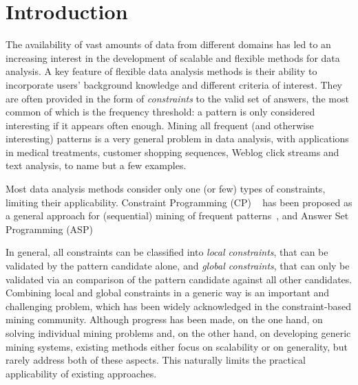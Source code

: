 

\section{Introduction}\label{sec:intro}
The availability of vast amounts of data from different domains has led to an increasing interest in the development of scalable and flexible methods for data analysis.
A key feature of flexible data analysis methods is their ability to incorporate users' background knowledge and different criteria of interest. They are often provided in the form of \emph{constraints} to the valid set of answers, the most common of which is the frequency threshold: a pattern is only considered interesting if it appears often enough. Mining all frequent (and otherwise interesting) patterns is a very general problem in data analysis, with applications in medical treatments, customer shopping sequences, Weblog click streams and text analysis, to name but a few examples.

Most data analysis methods consider only one (or few) types of constraints, limiting their applicability. Constraint Programming (CP) ~\parencite{DBLP:conf/cpaior/NegrevergneG15,DBLP:journals/ai/GunsDNTR17} has been proposed as a general approach for (sequential) mining of frequent patterns~\parencite{DBLP:books/mit/fayyadPSU96/AgrawalMSTV96}, and Answer Set Programming (ASP) 


In general, all constraints can be classified into \emph{local constraints}, that can be validated by the pattern candidate alone, and \emph{global constraints}, that can only be validated via an comparison of the pattern candidate against all other candidates. Combining local and global constraints in a generic way is an important and challenging problem, which has been widely acknowledged in the constraint-based mining community.  Although progress has been made, on the one hand, on solving individual mining problems and, on the other hand, on developing generic mining systems, existing methods either focus on scalability or on generality, but rarely address both of these aspects. This naturally limits the practical applicability of existing approaches.

